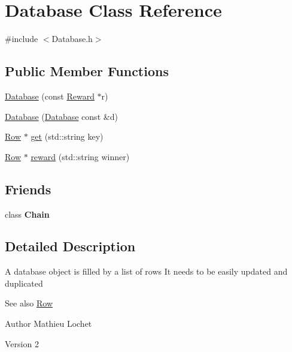\hypertarget{classDatabase}{}\section{Database Class Reference}
\label{classDatabase}


{\ttfamily \#include $<$Database.\+h$>$}

\subsection*{Public Member Functions}
\begin{DoxyCompactItemize}
\item 
\mbox{\hyperlink{classDatabase_aa4e642803d3c4ce8f0bf741429b0938d}{Database}} (const \mbox{\hyperlink{classReward}{Reward}} $\ast$r)
\item 
\mbox{\hyperlink{classDatabase_ab366035be8ad9836454da24f4a5e27ed}{Database}} (\mbox{\hyperlink{classDatabase}{Database}} const \&d)
\item 
\mbox{\hyperlink{classRow}{Row}} $\ast$ \mbox{\hyperlink{classDatabase_a748f2ce7df893cdb61d8418be907ac72}{get}} (std\+::string key)
\item 
\mbox{\hyperlink{classRow}{Row}} $\ast$ \mbox{\hyperlink{classDatabase_a5bdce9dce60e4fdb4f04c7baa023c0b8}{reward}} (std\+::string winner)
\end{DoxyCompactItemize}
\subsection*{Friends}
\begin{DoxyCompactItemize}
\item 
\mbox{\label{classDatabase_a65813570c30a3e0656fa523793ff1b86}} 
class {\bfseries Chain}
\end{DoxyCompactItemize}


\subsection{Detailed Description}
A database object is filled by a list of rows It needs to be easily updated and duplicated \begin{DoxySeeAlso}{See also}
\mbox{\hyperlink{classRow}{Row}}
\end{DoxySeeAlso}
\begin{DoxyAuthor}{Author}
Mathieu Lochet 
\end{DoxyAuthor}
\begin{DoxyVersion}{Version}
2 
\end{DoxyVersion}


